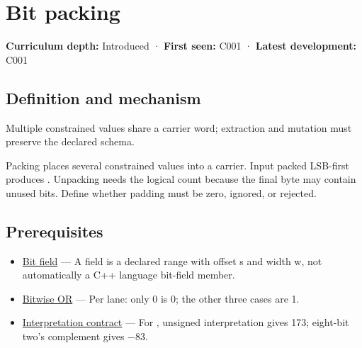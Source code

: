 \hypertarget{appendix-1f9963e1a5d1}{}\label{referencestart:appendix-1f9963e1a5d1}
\section{Bit packing}\label{appendix-1f9963e1a5d1-bit-packing}

\hypertarget{appendix-1f9963e1a5d1-bit-packing}{}

\textbf{Curriculum depth:} Introduced · \textbf{First seen:} C001 · \textbf{Latest development:} C001

\begin{allmightroledefinition}

\subsection{Definition and mechanism}\label{appendix-1f9963e1a5d1-definition-and-mechanism}

\hypertarget{appendix-1f9963e1a5d1-definition-and-mechanism}{}

Multiple constrained values share a carrier word; extraction and mutation must preserve the declared schema.

\end{allmightroledefinition}

Packing places several constrained values into a carrier. Input \BookInlineCode{{[}1,0,1,1,0,1,0,1{]}} packed LSB-first produces . Unpacking needs the logical count because the final byte may contain unused bits. Define whether padding must be zero, ignored, or rejected.

\subsection{Prerequisites}\label{appendix-1f9963e1a5d1-prerequisites}

\hypertarget{appendix-1f9963e1a5d1-prerequisites}{}

\begin{itemize}
\tightlist
\item
  \hyperref[appendix-ac697f5c66e8]{Bit field} --- A field is a declared range with offset s and width w, not automatically a C++ language bit-field member.
\item
  \hyperref[appendix-a427ce8ce8a6]{Bitwise OR} --- Per lane: only 0 is 0; the other three cases are 1.
\item
  \hyperref[appendix-f414bd4ed05c]{Interpretation contract} --- For , unsigned interpretation gives 173; eight-bit two's complement gives −83.
\end{itemize}


